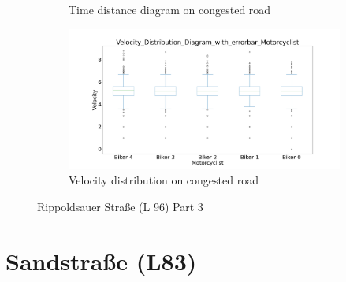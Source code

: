 \begin{figure}[H]
\begin{subfigure}[b]{0.45\textwidth}
        \caption{Time distance diagram on congested road}
    \end{subfigure}
    \hfill
    \begin{subfigure}[b]{0.45\textwidth}
        \centering
        \includegraphics[width=1.0\textwidth]{images/Rippoldsauer/Rippoldsauer_Velocity_Distribution_Diagram_with_errorbar_congested.png}
        \caption{Velocity distribution on congested road}
    \end{subfigure}
    \caption{Rippoldsauer Straße (L 96) Part 3}
\end{figure}



\section{Sandstraße (L83)}

